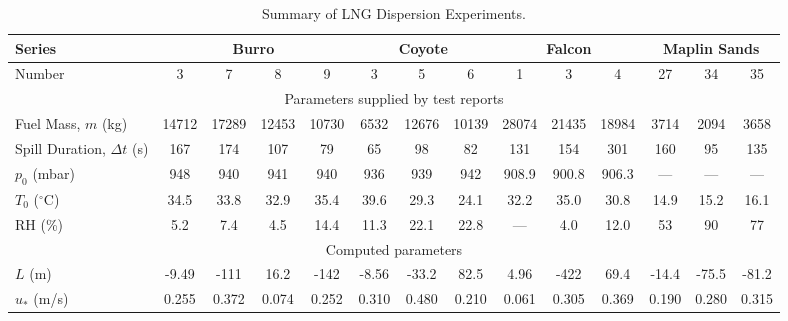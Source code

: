 \begin{sidewaystable}[p]
\caption{Summary of LNG Dispersion Experiments.}
\begin{center}
\begin{tabular}{|l|c|c|c|c|c|c|c|c|c|c|c|c|c|}
\hline
Series                         & \multicolumn{4}{|c|}{Burro}       & \multicolumn{3}{|c|}{Coyote}  & \multicolumn{3}{|c|}{Falcon}                  & \multicolumn{3}{|c|}{Maplin Sands}          \\ \hline
Number                         & 3      & 7      & 8      & 9      &  3     & 5      & 6           &  1          & 3           & 4                 &  27             & 34             & 35      \\ \hline \hline
\multicolumn{14}{|c|}{Parameters supplied by test reports} \\ \hline
Fuel Mass, $m$ (kg)            & 14712  & 17289  & 12453  & 10730  & 6532   & 12676  & 10139       & 28074       & 21435       & 18984             & 3714            & 2094           & 3658    \\ \hline
Spill Duration, $\Delta t$ (s) & 167    & 174    & 107    & 79     & 65     & 98     & 82          & 131         & 154         & 301               & 160             & 95             & 135     \\ \hline
$p_0$ (mbar)                   & 948    & 940    & 941    & 940    & 936    & 939    & 942         & 908.9       & 900.8       & 906.3             & ---             & ---            & ---     \\ \hline
$T_0$ ($^\circ$C)              & 34.5   & 33.8   & 32.9   & 35.4   & 39.6   & 29.3   & 24.1        & 32.2        & 35.0        & 30.8              & 14.9            & 15.2           & 16.1    \\ \hline
RH (\%)                        & 5.2    & 7.4    & 4.5    & 14.4   & 11.3   & 22.1   & 22.8        & ---         & 4.0         & 12.0              & 53              & 90             & 77      \\ \hline
\multicolumn{14}{|c|}{Computed parameters} \\ \hline
$L$ (m)                        & -9.49  & -111   & 16.2   & -142   & -8.56  & -33.2  & 82.5        & 4.96        & -422        & 69.4              & -14.4           & -75.5          & -81.2   \\ \hline
$u_*$ (m/s)                    & 0.255  & 0.372  & 0.074  & 0.252  & 0.310  & 0.480  & 0.210       & 0.061       & 0.305       & 0.369             & 0.190           & 0.280          & 0.315   \\ \hline

\end{tabular}
\end{center}
\end{sidewaystable}
